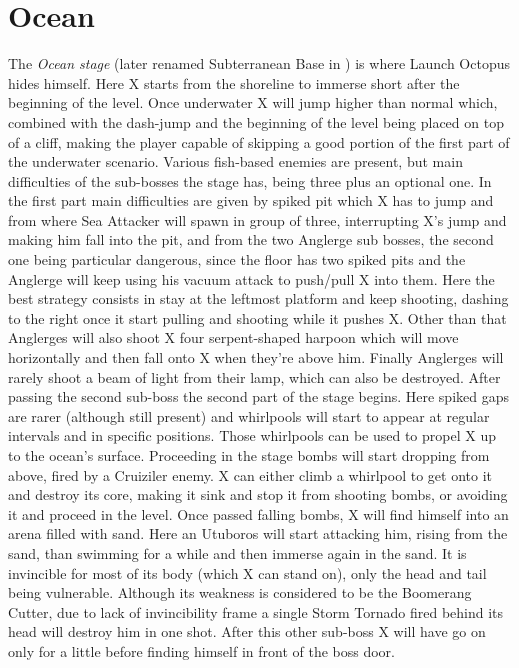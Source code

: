\section{Ocean}
The \textit{Ocean stage} (later renamed Subterranean Base in \mhx) is where Launch Octopus hides himself. Here X starts from the shoreline to immerse short after the beginning of the level. Once underwater X will jump higher than normal which, combined with the dash-jump and the beginning of the level being placed on top of a cliff, making the player capable of skipping a good portion of the first part of the underwater scenario\cite{stratwiki:Ocean}. Various fish-based enemies are present, but main difficulties of the sub-bosses the stage has, being three plus an optional one. In the first part main difficulties are given by spiked pit which X has to jump and from where Sea Attacker will spawn in group of three, interrupting X's jump and making him fall into the pit, and from the two Anglerge sub bosses, the second one being particular dangerous, since the floor has two spiked pits and the Anglerge will keep using his vacuum attack to push/pull X into them. Here the best strategy consists in stay at the leftmost platform and keep shooting, dashing to the right once it start pulling and shooting while it pushes X. Other than that Anglerges will also shoot X four serpent-shaped harpoon which will move horizontally and then fall onto X when they're above him. Finally Anglerges will rarely shoot a beam of light from their lamp, which can also be destroyed. After passing the second sub-boss the second part of the stage begins. Here spiked gaps are rarer (although still present) and whirlpools will start to appear at regular intervals and in specific positions. Those whirlpools can be used to propel X up to the ocean's surface. Proceeding in the stage bombs will start dropping from above, fired by a Cruiziler enemy. X can either climb a whirlpool to get onto it and destroy its core, making it sink and stop it from shooting bombs, or avoiding it and proceed in the level. Once passed falling bombs, X will find himself into an arena filled with sand. Here an Utuboros will start attacking him, rising from the sand, than swimming for a while and then immerse again in the sand. It is invincible for most of its body (which X can stand on), only the head and tail being vulnerable. Although its weakness is considered to be the Boomerang Cutter, due to lack of invincibility frame a single Storm Tornado fired behind its head will destroy him in one shot\cite{wiki:Utuboros}. After this other sub-boss X will have go on only for a little before finding himself in front of the boss door.

